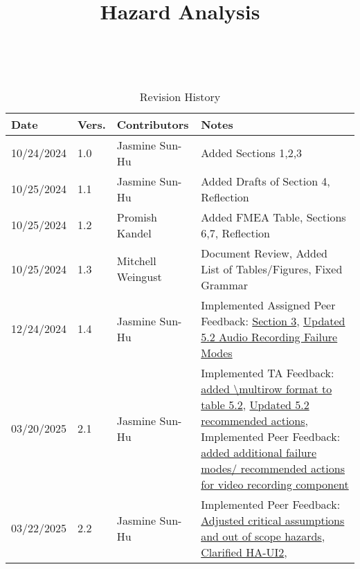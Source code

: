 \documentclass{article}
\title{Hazard Analysis\\\progname}
\author{\authname}
\date{}
\begin{document}
\maketitle
\thispagestyle{empty}

~\newpage


\begin{table}[hp]
\caption{Revision History} \label{TblRevisionHistory}
\begin{tabularx}{\textwidth}{p{1.5cm}p{1cm}p{3.5cm}X}
\toprule {\textbf{Date}} & {\textbf{Vers.}} & {\textbf{Contributors}} & {\textbf{Notes}}\\
\midrule
10/24/2024 & 1.0 & Jasmine Sun-Hu & Added Sections 1,2,3\\
10/25/2024 & 1.1 & Jasmine Sun-Hu & Added Drafts of Section 4, Reflection\\
10/25/2024 & 1.2 & Promish Kandel & Added FMEA Table, Sections 6,7, Reflection\\
10/25/2024 & 1.3 & Mitchell Weingust & Document Review, Added List of Tables/Figures, Fixed Grammar\\
12/24/2024 & 1.4 & Jasmine Sun-Hu & Implemented Assigned Peer Feedback: \href{https://github.com/parishanizam/TeleHealth/issues/131}{Section 3}, \href{https://github.com/parishanizam/TeleHealth/issues/157}{Updated 5.2 Audio Recording Failure Modes}\\
03/20/2025 & 2.1 & Jasmine Sun-Hu & Implemented TA Feedback: \href{https://github.com/parishanizam/TeleHealth/issues/233}{added \textbackslash multirow format to table 5.2}, \href{https://github.com/parishanizam/TeleHealth/issues/234}{Updated 5.2 recommended actions}, Implemented Peer Feedback: \href{https://github.com/parishanizam/TeleHealth/issues/153}{added additional failure modes/ recommended actions for video recording component}\\
03/22/2025 & 2.2 & Jasmine Sun-Hu & Implemented Peer Feedback: \href{https://github.com/parishanizam/TeleHealth/issues/155}{Adjusted critical assumptions and out of scope hazards}, \href{https://github.com/parishanizam/TeleHealth/issues/156}{Clarified HA-UI2}, \\
\bottomrule
\end{tabularx}
\end{table}

~\newpage

\tableofcontents
\listoffigures
\listoftables

~\newpage

\end{document}
